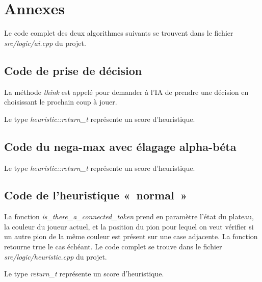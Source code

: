 \chapter{Annexes}

Le code complet des deux algorithmes suivants se trouvent dans le fichier \emph{src/logic/ai.cpp} du projet.

\section{Code de prise de décision}\label{src:think}



La méthode \emph{think} est appelé pour demander à l'IA de prendre une décision en choisissant le prochain coup à
jouer.

Le type \emph{heuristic::return\_t} représente un score d'heuristique.

\section{Code du nega-max avec élagage alpha-béta}\label{src:negamax}



Le type \emph{heuristic::return\_t} représente un score d'heuristique.

\newpage
\section{Code de l'heuristique « normal »}\label{src:heuristic_normal}



La fonction \emph{is\_there\_a\_connected\_token} prend en paramètre l'état du plateau, la couleur du joueur actuel,
et la position du pion pour lequel on veut vérifier si un autre pion de la même couleur est présent sur une case adjacente.
La fonction retourne true le cas échéant.
Le code complet se trouve dans le fichier \emph{src/logic/heuristic.cpp} du projet.

Le type \emph{return\_t} représente un score d'heuristique.

